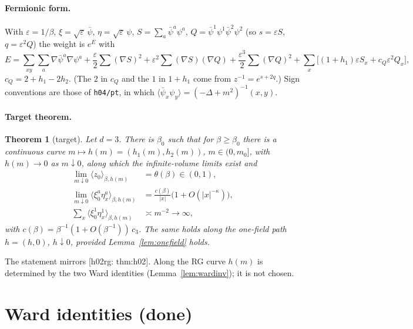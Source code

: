 \documentclass[11pt]{article}
\newtheorem{theorem}{Theorem}
\theoremstyle{definition}
\theoremstyle{remark}
\newcommand{\avg}[1]{\langle #1\rangle}
\newcommand{\eps}{\varepsilon}
\newcommand{\bpsi}{\bar\psi}
\newcommand{\reuse}[1]{\textsf{[h02rg: #1]}}
\begin{document}
\paragraph{Fermionic form.} With $\eps=1/\beta$, $\xi=\sqrt\eps\,\bpsi$, $\eta=\sqrt\eps\,\psi$,
$S=\sum_a\bpsi^a\psi^a$, $Q=\bpsi^1\psi^1\bpsi^2\psi^2$ (so $s=\eps S$, $q=\eps^2 Q$) the
weight is $e^{E}$ with
\begin{equation}\label{e:E}
  E=\sum_{xy}\sum_a\nabla\bpsi^a\nabla\psi^a+\frac{\eps}{2}\sum(\nabla S)^2+\eps^2\sum(\nabla S)(\nabla Q)
  +\frac{\eps^3}{2}\sum(\nabla Q)^2+\sum_x\big[(1+h_1)\eps S_x+c_Q\eps^2Q_x\big],
\end{equation}
$c_Q=2+h_1-2h_2$. (The $2$ in $c_Q$ and the $1$ in $1+h_1$ come from $z^{-1}=e^{s+2q}$.)
Sign conventions are those of \texttt{h04/pt}, in which $\avg{\bpsi_x\psi_y}=(-\Delta+m^2)^{-1}(x,y)$.

\paragraph{Target theorem.}
\begin{theorem}[target]\label{thm:main}
  Let $d=3$. There is $\beta_0$ such that for $\beta\ge\beta_0$ there is a continuous curve
  $m\mapsto h(m)=(h_1(m),h_2(m))$, $m\in(0,m_0]$, with $h(m)\to0$ as $m\downarrow0$, along
  which the infinite-volume limits exist and
  \begin{align*}
    \lim_{m\downarrow0}\avg{z_0}_{\beta,h(m)}&=\theta(\beta)\in(0,1),\\
    \lim_{m\downarrow0}\avg{\xi^a_0\eta^a_x}_{\beta,h(m)}&=\frac{c(\beta)}{|x|}\big(1+O(|x|^{-\kappa})\big),\\
    \sum_x\avg{\xi^1_0\eta^1_x}_{\beta,h(m)}&\asymp m^{-2}\to\infty,
  \end{align*}
  with $c(\beta)=\beta^{-1}(1+O(\beta^{-1}))\,c_3$. The same holds along the one-field path
  $h=(h,0)$, $h\downarrow0$, provided Lemma~\ref{lem:onefield} holds.
\end{theorem}

The statement mirrors \reuse{thm:h02}. Along the RG curve $h(m)$ is determined by the two Ward
identities (Lemma~\ref{lem:wardinv}); it is not chosen.

\section{Ward identities (done)}
\end{document}
